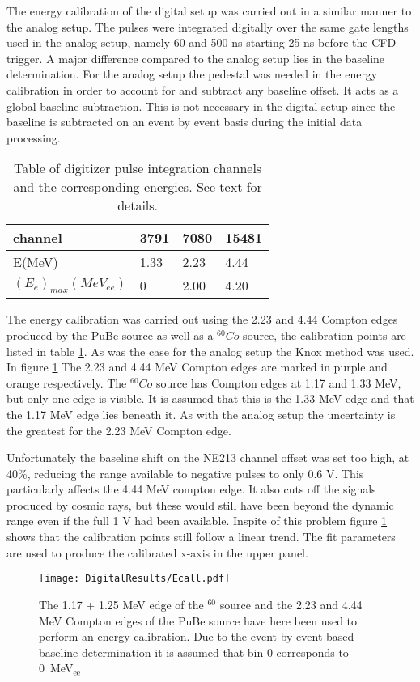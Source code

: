 \documentclass[main.tex]{subfiles}
\begin{document}
The energy calibration of the digital setup was carried out in a similar manner to the analog setup. The pulses were integrated digitally over the same gate lengths used in the analog setup, namely 60 and 500 ns starting 25 ns before the CFD trigger. A major difference compared to the analog setup lies in the baseline determination. For the analog setup the pedestal was needed in the energy calibration in order to account for and subtract any baseline offset. It acts as a global baseline subtraction. This is not necessary in the digital setup since the baseline is subtracted on an event by event basis during the initial data processing. 

\begin{table}[hb]
	\center
	\begin{tabular}{|l|l|l|l|}
	\hline
	channel            & 3791 & 7080  & 15481  \\
	\hline
	E(MeV)          & 1.33    & 2.23  & 4.44 \\
	\hline
	$(E_{e})_{max}(MeV_{ee})$ & 0    & 2.00  & 4.20 \\
	\hline
	\end{tabular}
   	\captionsetup{width=0.435\linewidth}
	\caption[Table of values used for energy calibration, digital setup.]{Table of digitizer pulse integration channels and the corresponding energies. See text for details.}
	\label{tab:knox_d}
\end{table}

The energy calibration was carried out using the 2.23 and 4.44 Compton edges produced by the PuBe source as well as a $^{60}Co$ source, the calibration points are listed in table \ref{tab:knox_d}. As was the case for the analog setup the Knox method was used. In figure \ref{fig:D_QDC} The 2.23 and 4.44 \si{\MeV} Compton edges are marked in purple and orange respectively. The $^{60}Co$ source has Compton edges at 1.17 and 1.33 \si{\MeV}, but only one edge is visible. It is assumed that this is the 1.33 \si{\MeV} edge and that the 1.17 \si{\MeV} edge lies beneath it. As with the analog setup the uncertainty is the greatest for the 2.23 MeV Compton edge.

Unfortunately the baseline shift on the NE213 channel offset was set too high, at 40\%, reducing the range available to negative pulses to only 0.6 V. This particularly affects the 4.44 \si{\MeV} compton edge. It also cuts off the signals produced by cosmic rays, but these would still have been beyond the dynamic range even if the full 1 V had been available. Inspite of this problem figure \ref{fig:D_QDC} shows that the calibration points still follow a linear trend. The fit parameters are used to produce the calibrated x-axis in the upper panel.

\begin{figure}[ht]
    \centering
        \texttt{[image: DigitalResults/Ecall.pdf]}
        \caption[Energy calibration of the digital setup]{The 1.17 + 1.25 MeV edge of the $^60$ source and the 2.23 and 4.44 MeV Compton edges of the PuBe source have here been used to perform an energy calibration. Due to the event by event based baseline determination it is assumed that bin 0 corresponds to \SI{0}{\MeV}$_\text{ee}$}
    \label{fig:D_QDC}
\end{figure}
\end{document}
